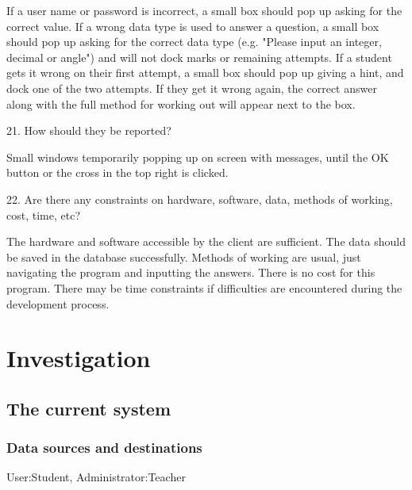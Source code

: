 If a user name or password is incorrect, a small box should pop up asking for the correct value. If a wrong data type is used to answer a question, a small box should pop up asking for the correct data type (e.g. "Please input an integer, decimal or angle") and will not dock marks or remaining attempts. If a student gets it wrong on their first attempt, a small box should pop up giving a hint, and dock one of the two attempts. If they get it wrong again, the correct answer along with the full method for working out will appear next to the box.

21. How should they be reported?

Small windows temporarily popping up on screen with messages, until the OK button or the cross in the top right is clicked.

22. Are there any constraints on hardware, software, data, methods of working, cost, time, etc?

The hardware and software accessible by the client are sufficient. The data should be saved in the database successfully. Methods of working are usual, just navigating the program and inputting the answers. There is no cost for this program. There may be time constraints if difficulties are encountered during the development process.

\section{Investigation}

\subsection{The current system}

\subsubsection{Data sources and destinations}

User:Student, Administrator:Teacher

